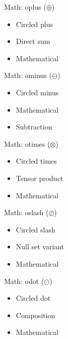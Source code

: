 \documentclass[12pt]{beamer}
\begin{document}
\begin{frame}{Math: oplus ($\oplus$)}
\begin{itemize}
  \item Circled plus
  \item Direct sum
  \item Mathematical
\end{itemize}
\end{frame}

\begin{frame}{Math: ominus ($\ominus$)}
\begin{itemize}
  \item Circled minus
  \item Mathematical
  \item Subtraction
\end{itemize}
\end{frame}

\begin{frame}{Math: otimes ($\otimes$)}
\begin{itemize}
  \item Circled times
  \item Tensor product
  \item Mathematical
\end{itemize}
\end{frame}

\begin{frame}{Math: oslash ($\oslash$)}
\begin{itemize}
  \item Circled slash
  \item Null set variant
  \item Mathematical
\end{itemize}
\end{frame}

\begin{frame}{Math: odot ($\odot$)}
\begin{itemize}
  \item Circled dot
  \item Composition
  \item Mathematical
\end{itemize}
\end{frame}

\end{document}
